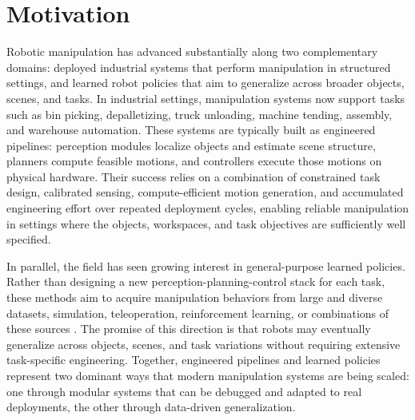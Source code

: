 \section{Motivation}
\label{sec:intro:landscape}

Robotic manipulation has advanced substantially along two complementary domains: deployed industrial systems that perform manipulation in structured settings, and learned robot policies that aim to generalize across broader objects, scenes, and tasks.
In industrial settings, manipulation systems now support tasks such as bin picking, depalletizing, truck unloading, machine tending, assembly, and warehouse automation.
These systems are typically built as engineered pipelines: perception modules localize objects and estimate scene structure, planners compute feasible motions, and controllers execute those motions on physical hardware.
Their success relies on a combination of constrained task design, calibrated sensing, compute-efficient motion generation, and accumulated engineering effort over repeated deployment cycles, enabling reliable manipulation in settings where the objects, workspaces, and task objectives are sufficiently well specified.

In parallel, the field has seen growing interest in general-purpose learned policies.
Rather than designing a new perception-planning-control stack for each task, these methods aim to acquire manipulation behaviors from large and diverse datasets, simulation, teleoperation, reinforcement learning, or combinations of these sources \cite{brohan2022rt,zhao2023learning,chi2023diffusionpolicy,andrychowicz2018learning,zitkovich2023rt}.
The promise of this direction is that robots may eventually generalize across objects, scenes, and task variations without requiring extensive task-specific engineering.
Together, engineered pipelines and learned policies represent two dominant ways that modern manipulation systems are being scaled: one through modular systems that can be debugged and adapted to real deployments, the other through data-driven generalization.

